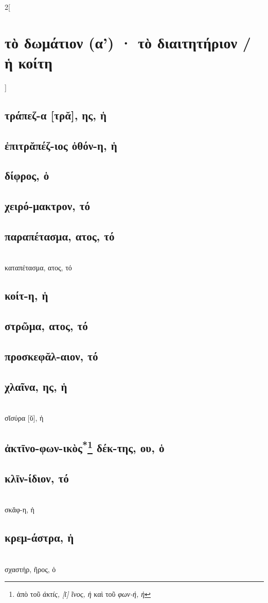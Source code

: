 \documentclass{book}
\begin{document}
\begin{multicols}{2}[\section{τὸ δωμάτιον (α') · τὸ διαιτητήριον / ἡ κοίτη}]
\subsection{τράπεζ-α [τρᾰ], ης, ἡ}
\subsection{ἐπιτρᾰπέζ-ιος ὀθόν-η, ἡ}
\subsection{δίφρος, ὁ}
\subsection{χειρό-μακτρον, τό}
\subsection{παραπέτασμα, ατος, τό}
 ~\\
καταπέτασμα, ατος, τό
\subsection{κοίτ-η, ἡ}
\subsection{στρῶμα, ατος, τό}
\subsection{προσκεφᾰλ-αιον, τό}
\subsection{χλαῖνα, ης, ἡ}
 ~\\
σῐσύρα [ῠ], ἡ
\subsection{ἀκτῑνο-φων-ικὸς\textsuperscript{*}\protect\footnote{ἀπὸ τοῦ \emph{ἀκτίς, [ῑ] ῖνος, ἡ} καὶ τοῦ \emph{φων-ή, ἡ}} δέκ-της, ου, ὁ}
\subsection{κλῑν-ίδιον, τό}
 ~\\
σκᾰφ-η, ἡ
\subsection{κρεμ-άστρα, ἡ}
 ~\\
σχαστήρ, ῆρος, ὁ
~
\end{multicols}
\end{document}
